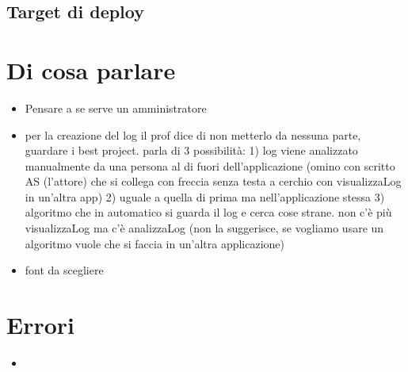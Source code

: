 \documentclass[12pt,a4paper]{report}
\begin{document}
\subsection{Target di deploy}

\newpage
\section{Di cosa parlare}
\begin{itemize}[leftmargin=*]
    \item Pensare a se serve un amministratore
    \item per la creazione del log il prof dice di non metterlo da nessuna parte, guardare i best project. parla di 3 possibilità: 1) log viene analizzato manualmente da una persona al di fuori dell'applicazione (omino con scritto AS (l'attore) che si collega con freccia senza testa a cerchio con visualizzaLog in un'altra app) 2) uguale a quella di prima ma nell'applicazione stessa 3) algoritmo che in automatico si guarda il log e cerca cose strane. non c'è più visualizzaLog ma c'è analizzaLog (non la suggerisce, se vogliamo usare un algoritmo vuole che si faccia in un'altra applicazione)
    \item font da scegliere
\end{itemize}

\section{Errori}
\begin{itemize}[leftmargin=*]
    \item 
\end{itemize}

\end{document}
